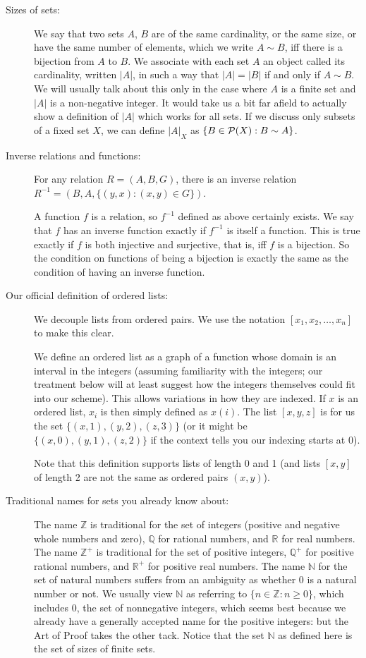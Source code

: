 \documentclass[12pt]{article}
\begin{document}
\begin{description}
\item[Sizes of sets:]  We say that two sets $A$, $B$ are of the same cardinality, or the same size, or have the same number of elements, which we write $A \sim B$, iff there is a bijection from $A$ to $B$.  We associate with each set $A$ an object called its cardinality, written $|A|$, in such a way that $|A| = |B|$ if and only if $A \sim B$.  We will usually talk about this only in the case where $A$ is a finite set
and $|A|$ is a non-negative integer.  It would take us a bit far afield to actually show a definition of $|A|$ which works for all sets.  If we discuss only subsets of a fixed set $X$, we can define $|A|_X$ as
$\{B \in {\cal P}(X):B \sim A\}$.

\item[Inverse relations and functions:]

For any relation $R=(A,B,G)$, there is an inverse relation $R^{-1} = (B,A,\{(y,x):(x,y)\in G\})$.

A function $f$ is a relation, so $f^{-1}$ defined as above certainly exists.  We say that $f$ has an inverse function exactly if $f^{-1}$ is itself a function.  This is true exactly if $f$ is both injective and surjective, that is, iff $f$ is a bijection.  So the condition on functions of being a bijection is exactly the same as the condition of having an inverse function.

\item[Our official definition of ordered lists:]  We decouple lists from ordered pairs.  We use the notation
$[x_1,x_2,\ldots,x_n]$ to make this clear.

We define an ordered list as a graph of a function whose domain is an interval in the integers (assuming familiarity with the integers;  our treatment below will at least suggest how the integers themselves could fit into our scheme).  This allows variations in how
they are indexed.  If $x$ is an ordered list, $x_i$ is then simply defined as $x(i)$.  The list $[x,y,z]$ is for us
the set $\{(x,1),(y,2),(z,3)\}$ (or it might be $\{(x,0),(y,1),(z,2)\}$ if the context tells you our indexing starts at 0).

Note that this definition supports lists of length 0 and 1 (and lists $[x,y]$ of length 2 are not the same as ordered pairs $(x,y)$).

\item[Traditional names for sets you already know about:]  The name $\mathbb Z$ is traditional for the set of integers (positive and negative whole numbers and zero), $\mathbb Q$ for rational numbers, and $\mathbb R$ for real numbers.  The name $\mathbb Z^+$ is traditional for the set of positive integers, $\mathbb Q^+$ for positive  rational numbers, and $\mathbb R^+$ for positive real numbers.   The name $\mathbb N$ for the set of natural numbers suffers from an ambiguity as whether 0 is a natural number or not.  We usually view $\mathbb N$ as referring to $\{n \in \mathbb Z:n \geq 0\}$, which includes 0, the set of nonnegative integers, which seems best because we already have a generally accepted name for the positive integers:  but the Art of Proof takes the other tack.  Notice that the set $\mathbb N$ as defined here is the set of sizes of finite sets.



\end{description}
\end{document}
